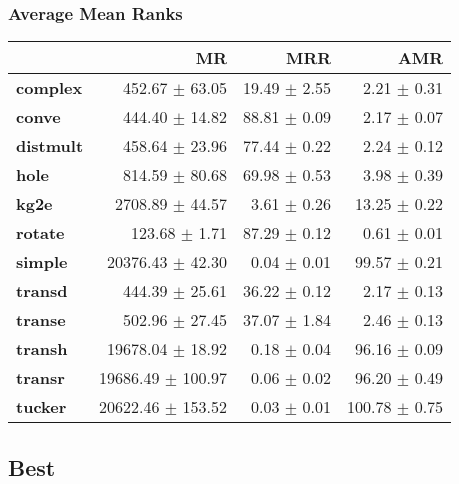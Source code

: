 \documentclass{article}
\begin{document}
    \subsubsection{Average Mean Ranks}
    \begin{center}
    \begin{tabular}{lrrr}
\toprule
{} &                 MR &           MRR &            AMR \\
\midrule
\textbf{complex } &     452.67 $\pm$ 63.05 &  19.49 $\pm$ 2.55 &    2.21 $\pm$ 0.31 \\
\textbf{conve   } &     444.40 $\pm$ 14.82 &  88.81 $\pm$ 0.09 &    2.17 $\pm$ 0.07 \\
\textbf{distmult} &     458.64 $\pm$ 23.96 &  77.44 $\pm$ 0.22 &    2.24 $\pm$ 0.12 \\
\textbf{hole    } &     814.59 $\pm$ 80.68 &  69.98 $\pm$ 0.53 &    3.98 $\pm$ 0.39 \\
\textbf{kg2e    } &    2708.89 $\pm$ 44.57 &   3.61 $\pm$ 0.26 &   13.25 $\pm$ 0.22 \\
\textbf{rotate  } &      123.68 $\pm$ 1.71 &  87.29 $\pm$ 0.12 &    0.61 $\pm$ 0.01 \\
\textbf{simple  } &   20376.43 $\pm$ 42.30 &   0.04 $\pm$ 0.01 &   99.57 $\pm$ 0.21 \\
\textbf{transd  } &     444.39 $\pm$ 25.61 &  36.22 $\pm$ 0.12 &    2.17 $\pm$ 0.13 \\
\textbf{transe  } &     502.96 $\pm$ 27.45 &  37.07 $\pm$ 1.84 &    2.46 $\pm$ 0.13 \\
\textbf{transh  } &   19678.04 $\pm$ 18.92 &   0.18 $\pm$ 0.04 &   96.16 $\pm$ 0.09 \\
\textbf{transr  } &  19686.49 $\pm$ 100.97 &   0.06 $\pm$ 0.02 &   96.20 $\pm$ 0.49 \\
\textbf{tucker  } &  20622.46 $\pm$ 153.52 &   0.03 $\pm$ 0.01 &  100.78 $\pm$ 0.75 \\
\bottomrule
\end{tabular}

    \end{center}
    \subsection{Best}
\end{document}
